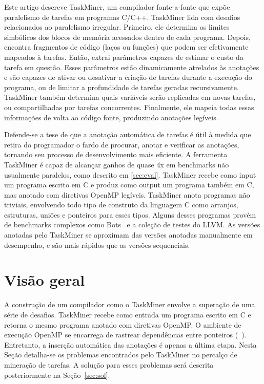 \documentclass[sigplan,10pt,review]{acmart}
\newcommand\Taskminer{\mbox{\textsf{TaskMiner}}}
\begin{document}
Este artigo descreve {\Taskminer}, um compilador fonte-a-fonte que expõe
paralelismo de tarefas em programas C/C++. {\Taskminer} lida com desafios 
relacionados ao paralelismo irregular. Primeiro, ele determina os limites
simbólicos dos blocos de memória acessados dentro de cada programa. Depois, encontra 
fragmentos de código (laços ou funções) que podem 
ser efetivamente mapeados à tarefas. Então, extrai parâmetros capazes
de estimar o custo da tarefa em questão. Esses parâmetros estão dinamicamente atrelados
às anotações e são capazes de ativar ou desativar a criação de tarefas durante a execução do programa,
ou de limitar a profundidade de tarefas geradas recursivamente. \Taskminer{} também determina
quais variáveis serão replicadas em novas tarefas, ou compartilhadas por tarefas concorrentes.
Finalmente, ele mapeia todas essas informações de volta ao código fonte, produzindo
anotações legíveis.

Defende-se a tese de que a anotação automática de tarefas é útil à medida que
retira do programador o fardo de procurar, anotar e verificar as anotações, tornando seu
processo de desenvolvimento mais eficiente. A ferramenta {\Taskminer} é capaz
de alcançar ganhos de quase 4x em benchmarks não usualmente paralelos, como descrito em \ref{sec:eval}. {\Taskminer}
recebe como input um programa escrito em C e produz como output um programa também em C,
mas anotado com diretivas OpenMP legíveis. {\Taskminer} anota programas não triviais, envolvendo
todo tipo de construto da linguagem C como arranjos, estruturas, uniões e ponteiros para esses tipos.
Alguns desses programas provém de benchmarks complexos como Bots~\cite{Duran09}  e a coleção de testes do LLVM.
As versões anotadas pelo {\Taskminer} se aproximam das versões anotadas manualmente em
desempenho, e são mais rápidos que as versões sequenciais.


\section{Visão geral}
\label{sec:ovf}

A construção de um compilador como o \Taskminer{} envolve a superação de uma série  de desafios.
\Taskminer{} recebe como entrada um programa escrito em C e retorna o mesmo programa anotado com 
diretivas OpenMP. O ambiente de execução OpenMP se encarrega de 
rastrear dependências entre ponteiros (~\cite{LaGrone11}). Entretanto, a inserção
automática das anotações é apenas a última etapa. Nesta Seção detalha-se os problemas
encontrados pelo \Taskminer{} no percalço de mineração de tarefas. A solução para esses problemas será descrita 
posteriormente na Seção~\ref{sec:sol}.
\end{document}
